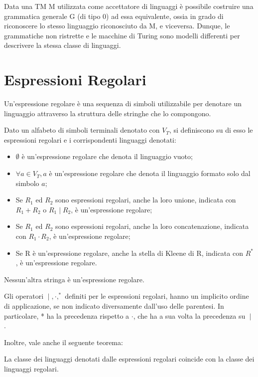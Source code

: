   \begin{theorem}
    Data una TM M utilizzata come accettatore di linguaggi è possibile costruire una grammatica generale G (di tipo 0) ad essa equivalente, ossia in grado di riconoscere lo stesso linguaggio riconosciuto da M, e viceversa. Dunque, le grammatiche non ristrette e le macchine di Turing sono modelli differenti per descrivere la stessa classe di linguaggi.
  \end{theorem}

  \section{Espressioni Regolari}
  Un'espressione regolare è una sequenza di simboli utilizzabile per denotare un linguaggio attraverso la struttura delle stringhe che lo compongono.

  \begin{definition}
    Dato un alfabeto di simboli terminali denotato con \(V_T\), si definiscono su di esso le espressioni regolari e i corrispondenti linguaggi denotati:
    \begin{itemize}
      \item \(\emptyset\) è un'espressione regolare che denota il linguaggio vuoto;
      \item \(\forall a\in V_T, a\) è un'espressione regolare che denota il linguaggio formato solo dal simbolo \(a\);
      \item Se \(R_1\) ed \(R_2\) sono espressioni regolari, anche la loro unione, indicata con \(R_1+R_2\) o \(R_1\;|\;R_2\), è un'espressione regolare;
      \item Se \(R_1\) ed \(R_2\) sono espressioni regolari, anche la loro concatenazione, indicata con \(R_1\cdot R_2\), è un'espressione regolare;
      \item Se R è un'espressione regolare, anche la stella di Kleene di R, indicata con \(R^*\), è un'espressione regolare.
    \end{itemize}
  \end{definition}

  Nessun'altra stringa è un'espressione regolare.

  Gli operatori \(\;|\;, \cdot, ^*\) definiti per le espressioni regolari, hanno un implicito ordine di applicazione, se non indicato diversamente dall'uso delle parentesi. In particolare, * ha la precedenza rispetto a \(\cdot\), che ha a sua volta la precedenza su \(\;|\;\).
  
  Inoltre, vale anche il seguente teorema:
  \begin{theorem}
    La classe dei linguaggi denotati dalle espressioni regolari coincide con la classe dei linguaggi regolari. 
  \end{theorem}

